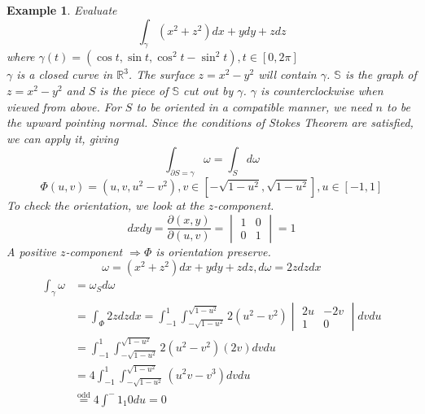 \documentclass[12pt]{article}
\theoremstyle{plain}
\newtheorem{example}[theorem]{Example}
\theoremstyle{definition}
\begin{document}
\begin{example}
	Evaluate
	$$\int_\gamma (x^2 + z^2)dx + ydy + zdz$$
	where $\gamma (t) = (\cos t, \sin t, \cos^2 t - \sin^2 t), t \in [0,2\pi]$\\
	$\gamma$ is a closed curve in $\mathbb{R}^3$. The surface $z=x^2-y^2$ will contain $\gamma$. $\mathbb{S}$ is the graph of $z=x^2-y^2$ and $S$ is the piece of $\mathbb{S}$ cut out by $\gamma$. $\gamma$ is counterclockwise when viewed from above. For $S$ to be oriented in a compatible manner, we need $n$ to be the upward pointing normal. Since the conditions of Stokes Theorem are satisfied, we can apply it, giving
	$$\int_{\partial S =\gamma} \omega = \int_S d\omega$$
	$$\Phi (u,v) = (u,v, u^2-v^2), v \in [-\sqrt{1-u^2}, \sqrt{1-u^2}], u\in [-1,1]$$
	To check the orientation, we look at the $z$-component.
	$$dxdy = \frac{\partial (x,y)}{\partial (u,v)} = \begin{vmatrix}
1 & 0 \\
0 & 1
\end{vmatrix} = 1$$
A positive $z$-component $\Longrightarrow \Phi$ is orientation preserve.
$$\omega = (x^2 + z^2)dx + ydy + zdz, d\omega = 2zdzdx$$
\begin{align*}
	\int_\gamma \omega &= \omega_S d\omega\\
	&= \int_\Phi 2zdzdx = \int^1_{-1} \int^{\sqrt{1-u^2}}_{-\sqrt{1-u^2}} 2(u^2-v^2) \begin{vmatrix}
2u & -2v \\
1 & 0
\end{vmatrix}dv du\\
&= \int^1_{-1} \int^{\sqrt{1-u^2}}_{-\sqrt{1-u^2}} 2(u^2-v^2) (2v)dv du\\
&= 4\int^1_{-1} \int^{\sqrt{1-u^2}}_{-\sqrt{1-u^2}} (u^2v-v^3)dvdu\\
&\overset{\text{odd}}{=} 4 \int^-1_1 0 du = 0
\end{align*}
\end{example}
\end{document}
